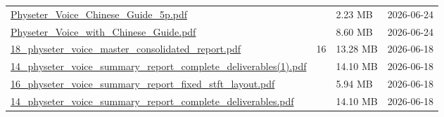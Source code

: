 \documentclass[UTF8,fontset=fandol,10pt,a4paper]{ctexart}
\begin{document}
\begin{longtable}{@{}L{\dimexpr\linewidth-50mm-6\tabcolsep\relax}R{8mm}R{16mm}R{26mm}@{}}
\href{https://chatgpt.com/library?file_id=libfile_881938ff93fc81918f89749352c40ea2&account_id=personal}{Physeter\_\allowbreak{}Voice\_\allowbreak{}Chinese\_\allowbreak{}Guide\_\allowbreak{}5p.\allowbreak{}pdf} & \textemdash{} & 2.23 MB & 2026-06-24 \\
\href{https://chatgpt.com/library?file_id=libfile_5aa387a2fd208191a1ed9ca8e7443117&account_id=personal}{Physeter\_\allowbreak{}Voice\_\allowbreak{}with\_\allowbreak{}Chinese\_\allowbreak{}Guide.\allowbreak{}pdf} & \textemdash{} & 8.60 MB & 2026-06-24 \\
\href{https://chatgpt.com/library?file_id=libfile_7950bb24047c8191919b06760c6a7dd0&account_id=personal}{18\_\allowbreak{}physeter\_\allowbreak{}voice\_\allowbreak{}master\_\allowbreak{}consolidated\_\allowbreak{}report.\allowbreak{}pdf} & 16 & 13.28 MB & 2026-06-18 \\
\href{https://chatgpt.com/library?file_id=libfile_293e9d22946881918610434b6e3bdcae&account_id=personal}{14\_\allowbreak{}physeter\_\allowbreak{}voice\_\allowbreak{}summary\_\allowbreak{}report\_\allowbreak{}complete\_\allowbreak{}deliverables(1).\allowbreak{}pdf} & \textemdash{} & 14.10 MB & 2026-06-18 \\
\href{https://chatgpt.com/library?file_id=libfile_f90c611ebf50819199d20c53d3e787da&account_id=personal}{16\_\allowbreak{}physeter\_\allowbreak{}voice\_\allowbreak{}summary\_\allowbreak{}report\_\allowbreak{}fixed\_\allowbreak{}stft\_\allowbreak{}layout.\allowbreak{}pdf} & \textemdash{} & 5.94 MB & 2026-06-18 \\
\href{https://chatgpt.com/library?file_id=libfile_c0ce79f53f9c81918bdcf0e33100ed7f&account_id=personal}{14\_\allowbreak{}physeter\_\allowbreak{}voice\_\allowbreak{}summary\_\allowbreak{}report\_\allowbreak{}complete\_\allowbreak{}deliverables.\allowbreak{}pdf} & \textemdash{} & 14.10 MB & 2026-06-18 \\
\end{longtable}
\endgroup
\Needspace{55mm}
\end{document}
